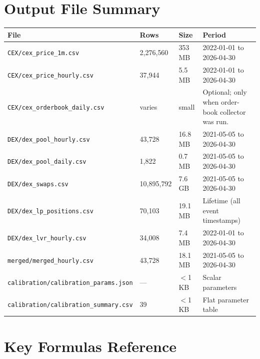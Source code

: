 \documentclass[11pt,a4paper]{article}
\begin{document}
\section{Output File Summary}
\label{sec:summary}

\begin{xltabular}{\linewidth}{L{5.8cm}L{2.0cm}L{1.8cm}Y}
\toprule
\textbf{File} & \textbf{Rows} & \textbf{Size} & \textbf{Period} \\
\midrule
\texttt{CEX/cex\_price\_1m.csv} & 2{,}276{,}560 & 353 MB &
  2022-01-01 to 2026-04-30 \\
\texttt{CEX/cex\_price\_hourly.csv} & 37{,}944 & 5.5 MB &
  2022-01-01 to 2026-04-30 \\
\texttt{CEX/cex\_orderbook\_daily.csv} & varies & small &
  Optional; only when order-book collector was run. \\
\texttt{DEX/dex\_pool\_hourly.csv} & 43{,}728 & 16.8 MB &
  2021-05-05 to 2026-04-30 \\
\texttt{DEX/dex\_pool\_daily.csv} & 1{,}822 & 0.7 MB &
  2021-05-05 to 2026-04-30 \\
\texttt{DEX/dex\_swaps.csv} & 10{,}895{,}792 & 7.6 GB &
  2021-05-05 to 2026-04-30 \\
\texttt{DEX/dex\_lp\_positions.csv} & 70{,}103 & 19.1 MB &
  Lifetime (all event timestamps) \\
\texttt{DEX/dex\_lvr\_hourly.csv} & 34{,}008 & 7.4 MB &
  2022-01-01 to 2026-04-30 \\
\texttt{merged/merged\_hourly.csv} & 43{,}728 & 18.1 MB &
  2021-05-05 to 2026-04-30 \\
\texttt{calibration/calibration\_params.json} & --- & $<$1 KB &
  Scalar parameters \\
\texttt{calibration/calibration\_summary.csv} & 39 & $<$1 KB &
  Flat parameter table \\
\bottomrule
\end{xltabular}

\section{Key Formulas Reference}
\label{sec:formulas}
\end{document}
